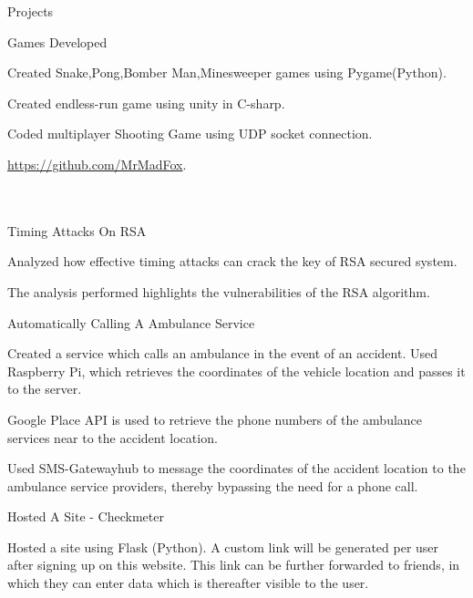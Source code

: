 \documentclass{resume} %
\begin{document}
\begin{rSection}{Projects}

\begin{rSubsection}{ Games Developed}{}{}

\item Created Snake,Pong,Bomber Man,Minesweeper games using Pygame(Python).
\item Created endless-run game using unity in C-sharp.
\item Coded multiplayer Shooting Game using UDP socket connection.
\item  \url{https://github.com/MrMadFox}.
\\
\\
\\

\end{rSubsection}

\begin{rSubsection}{ Timing Attacks On RSA}{}{}

\item Analyzed how effective timing attacks can crack the key of RSA secured system.
\item The analysis performed highlights the vulnerabilities of the RSA algorithm.

\end{rSubsection}


\begin{rSubsection}{ Automatically Calling A Ambulance Service}{}{}

\item Created a service which calls an ambulance in the event of an accident. Used Raspberry Pi, which retrieves the coordinates of the vehicle location and passes it to the server.
\item Google Place API is used to retrieve the phone numbers of the ambulance services near to the accident location.
\item Used SMS-Gatewayhub to message the coordinates of the accident location to the ambulance service providers, thereby bypassing the need for a phone call.

\end{rSubsection}


\begin{rSubsection}{ Hosted A Site - Checkmeter}{}{}

\item Hosted a site using Flask (Python). A custom link will be generated per user after signing up on this website. This link can be further forwarded to friends, in which they can enter data which is thereafter visible to the user.


\end{rSubsection}
\end{rSection}
\end{document}
